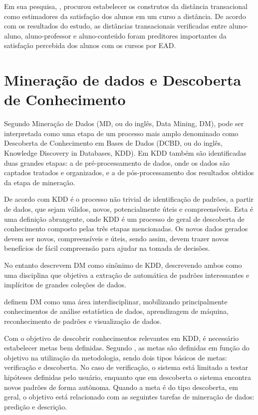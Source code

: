 Em sua pesquisa, , procurou estabelecer os
construtos da distância transacional como estimadores da satisfação dos alunos
em um curso a distância. De acordo com os resultados do estudo, as distâncias
transacionais verificadas entre aluno-aluno, aluno-professor e aluno-conteúdo
foram preditores importantes da satisfação percebida dos alunos com os cursos
por EAD.

\section{Mineração de dados e Descoberta de Conhecimento}

Segundo  Mineração de Dados (MD, ou do inglês,
Data Mining, DM), pode ser interpretada como uma etapa de um processo mais amplo
denominado como Descoberta de Conhecimento em Bases de Dados (DCBD, ou do
inglês, Knowledge Discovery in Databases, KDD). Em KDD também são identificadas
duas grandes etapas: a de pré-processamento de dados, onde os dados são captados
tratados e organizados, e a de pós-processamento dos resultados obtidos da etapa
de mineração.

De acordo com  KDD é o processo não trivial de
identificação de padrões, a partir de dados, que sejam válidos, novos,
potencialmente úteis e compreensíveis. Esta é uma definição abrangente, onde KDD
é um processo de geral de descoberta de conhecimento composto pelas três etapas
mencionadas. Os novos dados gerados devem ser novos, compreensíveis e úteis,
sendo assim, devem trazer novos benefícios de fácil compreensão para ajudar na
tomada de decisões.

No entanto  descrevem DM como sinônimo de KDD,
descrevendo ambos como uma disciplina que objetiva a extração de automática de
padrões interessantes e implícitos de grandes coleções de dados.

 definem DM como uma área interdisciplinar,
mobilizando principalmente conhecimentos de análise estatística de dados,
aprendizagem de máquina, reconhecimento de padrões e visualização de dados.

Com o objetivo de descobrir conhecimentos relevantes em KDD, é necessário
estabelecer metas bem definidas. Segundo , as metas
são definidas em função do objetivo na utilização da metodologia, sendo dois
tipos básicos de metas: verificação e descoberta. No caso de verificação, o
sistema está limitado a testar hipóteses definidas pelo usuário, enquanto que em
descoberta o sistema encontra novos padrões de forma autônoma. Quando a meta é
do tipo descoberta, em geral, o objetivo está relacionado com as seguintes
tarefas de mineração de dados: predição e descrição.

